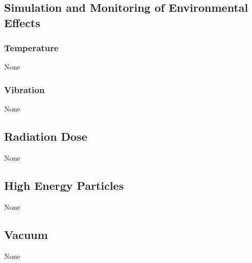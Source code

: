 \documentclass{article}
\begin{document}
\subsection{Simulation and Monitoring of Environmental Effects}
\subsubsection{Temperature}
None
\subsubsection{Vibration}
None
\subsection{Radiation Dose}
None
\subsection{High Energy Particles}
None
\subsection{Vacuum}
None
\end{document}
